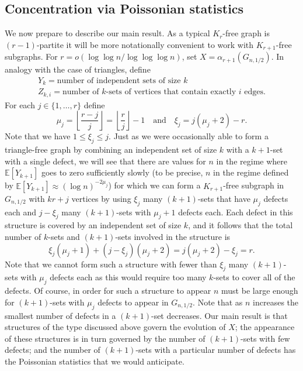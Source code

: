 \documentclass[11pt]{article}
\theoremstyle{definition}
\theoremstyle{remark}
\newcommand{\E}{\mathbb{E}}
\begin{document}
\subsection{Concentration via Poissonian statistics} \label{sec:Poissonian}
We now prepare to describe our main result.  As a typical $K_r$-free graph is $(r-1)$-partite it will be more notationally convenient to work with $K_{r+1}$-free subgraphs. For $r = o(\log \log n / \log\log\log n)$, set $X = \alpha_{r+1}(G_{n,1/2}).$ In analogy with the case of triangles, define  
\begin{gather*}Y_k =
\text{number of independent sets of size }k \\
 Z_{k,i} = \text{number of }k\text{-sets
of vertices that contain exactly }i\text{ edges}.   
\end{gather*} 
For each $ j \in \{1, \dots, r\}$ define
\[ \mu_j = \left\lfloor \frac{r-j}{j} \right\rfloor = \left\lfloor \frac{r}{j} \right\rfloor -1 \ \ \ \text{ and } \ \ \
\xi_j = j ( \mu_j +2) -r. \]
Note that we have $ 1 \le \xi_j \le j$.  Just as we were occasionally able to form a triangle-free graph by combining an independent set of size $k$ with a $k+1$-set with a single defect, we will see that there are values for $n$ 
in the regime where $ \E[ Y_{k+1}]$ goes to zero sufficiently slowly (to be
precise, $n$ in the regime defined by 
$ \E[Y_{k+1}] \approx ( \log n)^{- 2\mu_j} $) 
for which we can form a $K_{r+1}$-free subgraph in $ G_{n,1/2}$
with $kr + j$ vertices by using $\xi_j$ many $(k+1)$-sets that have $\mu_j$ defects each and $j - \xi_j$ many $(k+1)$-sets with $ \mu_j+1$ defects each. Each defect
in this structure is covered by an independent set of size $k$, and it
follows that the total number of $k$-sets and $(k+1)$-sets involved
in the structure is
%
\[ \xi_j ( \mu_j +1) + (j - \xi_j)( \mu_j +2) =  j( \mu_j+2) - \xi_j  = r. \] 
Note that we cannot form such a structure with fewer than $ \xi_j$ many $(k+1)$-sets with $\mu_j$ defects each as this would require too many $k$-sets to cover all of the defects.
Of course, in order for such a structure to 
appear $n$ must be large enough for $(k+1)$-sets
with $ \mu_j$ defects to appear in $ G_{n,1/2}$. Note that as $n$ increases the smallest number of defects in a $(k+1)$-set decreases.  
Our main result is that structures of the type discussed above govern the
evolution of $X$; the appearance of these structures
is in turn governed by the number of
$(k+1)$-sets with few defects; and the number of
$(k+1)$-sets with a particular number of defects has the Poissonian statistics that we would anticipate. 
\end{document}
